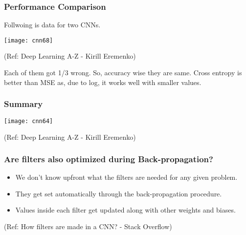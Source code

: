 \begin{frame}[fragile] \frametitle{Performance Comparison}

Follwoing is data for two CNNs.

\begin{center}
\texttt{[image: cnn68]}

\tiny{(Ref: Deep Learning A-Z - Kirill Eremenko)}
\end{center}

Each of them got 1/3 wrong. So, accuracy wise they are same. Cross entropy is better than MSE as, due to log, it works well with smaller values.
\end{frame}



\begin{frame}[fragile] \frametitle{Summary}

\begin{center}
\texttt{[image: cnn64]}

\tiny{(Ref: Deep Learning A-Z - Kirill Eremenko)}
\end{center}

\end{frame}

\begin{frame}[fragile] \frametitle{Are filters also optimized during Back-propagation?}

\begin{itemize}
\item  We don't know upfront what the filters are needed for any given problem. 
\item They get set automatically through the back-propagation procedure. 
\item Values inside each filter get updated along with other weights and biases.
\end{itemize}

\tiny{(Ref: How filters are made in a CNN? - Stack Overflow)}
\end{frame}


